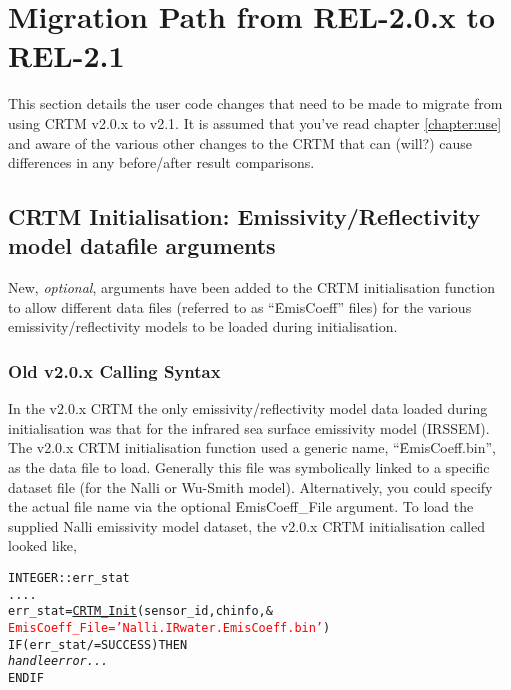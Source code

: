 \chapter{Migration Path from REL-2.0.x to REL-2.1}
\label{chapter:migration_path}

This section details the user code changes that need to be made to migrate from using CRTM v2.0.x to v2.1. It is assumed that you've read chapter \ref{chapter:use} and aware of the various other changes to the CRTM that can (will?) cause differences in any before/after result comparisons.


\section{CRTM Initialisation: Emissivity/Reflectivity model datafile arguments}
New, \emph{optional}, arguments have been added to the CRTM initialisation function to allow different data files (referred to as ``\f{EmisCoeff}'' files) for the various emissivity/reflectivity models to be loaded during initialisation.


\subsection{Old v2.0.x Calling Syntax}
In the v2.0.x CRTM the only emissivity/reflectivity model data loaded during initialisation was that for the infrared sea surface emissivity model (IRSSEM). The v2.0.x CRTM initialisation function used a generic name, ``\f{EmisCoeff.bin}'', as the data file to load. Generally this file was symbolically linked to a specific dataset file (for the Nalli or Wu-Smith model). Alternatively, you could specify the actual file name via the optional \f{EmisCoeff\_File} argument. To load the supplied Nalli emissivity model dataset, the v2.0.x CRTM initialisation called looked like,

\begin{alltt}
  INTEGER :: err_stat
  ....
  err_stat = \hyperref[sec:CRTM_Init_interface]{CRTM_Init}( sensor_id, chinfo, &
                        \textcolor{red}{EmisCoeff_File = 'Nalli.IRwater.EmisCoeff.bin'} )
  IF ( err_stat /= SUCCESS ) THEN
    \textrm{\textit{handle error...}}
  END IF\end{alltt}


